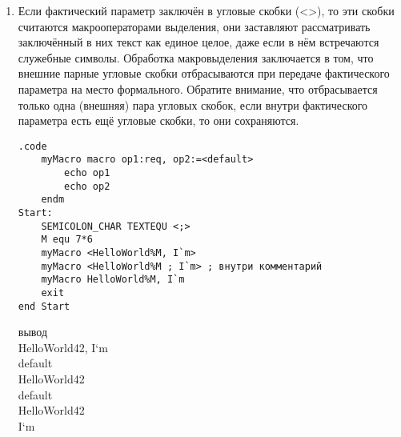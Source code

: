\documentclass[a4paper,10pt]{article}
\begin{document}
\begin{enumerate}
\begin{multicols}{2}
\begin{verbatim}
.code
    myMacro macro op1:req
        echo op1
    endm
Start:
    M equ 7*6
    myMacro HelloWorld%M
    myMacro HelloWorld!%M
    myMacro HelloWorld!!!%M
    myMacro Helloworld!!
    myMacro !Helloworld
    myMacro Helloworld!
    exit
end Start
\end{verbatim}
    \columnbreak
вывод \\
HelloWorld42 \\
HelloWorld\%M \\
HelloWorld!\%M \\
Helloworld! \\
Helloworld \\
test.asm(17) : error A2038: missing operand for macro operator \\
 myMacro(1): Macro Called From \\
  test.asm(17): Main Line Code \\
Helloworld! \\
\end{multicols}
отметим что \% и ! поставленные в конце выражения выдадут ошибку, необходимо экранировать
\item Если фактический параметр заключён в угловые скобки (<>), то эти скобки считаются макрооператорами выделения, они заставляют рассматривать заключённый в них текст как единое целое, даже если в нём встречаются служебные символы. Обработка макровыделения заключается в том, что внешние парные угловые скобки отбрасываются при передаче фактического параметра на место формального. Обратите внимание, что отбрасывается только
одна (внешняя) пара угловых скобок, если внутри фактического параметра есть ещё угловые
скобки, то они сохраняются.
\begin{multicols}{2}
\begin{verbatim}
.code
    myMacro macro op1:req, op2:=<default>
        echo op1
        echo op2
    endm
Start:
    SEMICOLON_CHAR TEXTEQU <;>
    M equ 7*6
    myMacro <HelloWorld%M, I`m>
    myMacro <HelloWorld%M ; I`m> ; внутри комментарий
    myMacro HelloWorld%M, I`m
    exit
end Start
\end{verbatim}
    \columnbreak
вывод \\
HelloWorld42, I`m \\
default \\
HelloWorld42 \\
default \\
HelloWorld42 \\
I`m \\
\end{multicols}


\end{enumerate}
\end{document}
